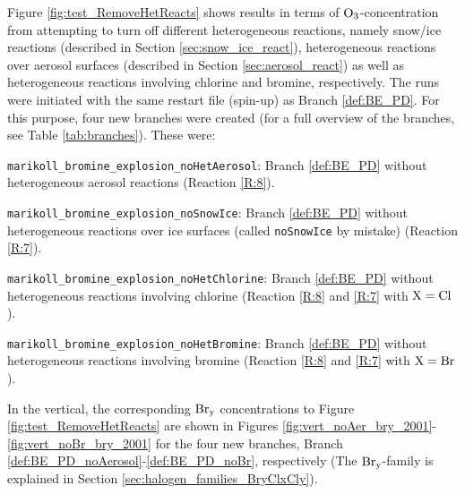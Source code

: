 Figure \ref{fig:test_RemoveHetReacts} shows results in terms of $\mathrm{O_3}$-concentration from attempting to turn off different heterogeneous reactions, namely snow/ice reactions (described in Section \ref{sec:snow_ice_react}), heterogeneous reactions over aerosol surfaces (described in Section \ref{sec:aerosol_react}) as well as heterogeneous reactions involving chlorine and bromine, respectively. The runs were initiated with the same restart file (spin-up) as Branch \ref{def:BE_PD}. For this purpose, four new branches were created (for a full overview of the branches, see Table \ref{tab:branches}). These were:

\begin{mydef}\label{def:BE_PD_noAerosol}
    \texttt{marikoll\_bromine\_explosion\_noHetAerosol}: Branch \ref{def:BE_PD} without heterogeneous aerosol reactions (Reaction \ref{R:8}). 
\end{mydef}

\begin{mydef}\label{def:BE_PD_noIce}
    \texttt{marikoll\_bromine\_explosion\_noSnowIce}: Branch \ref{def:BE_PD} without heterogeneous reactions over ice surfaces (called \texttt{noSnowIce} by mistake) (Reaction \ref{R:7}).
\end{mydef}

\begin{mydef}\label{def:BE_PD_noCl}
    \texttt{marikoll\_bromine\_explosion\_noHetChlorine}: Branch \ref{def:BE_PD} without heterogeneous reactions involving chlorine (Reaction \ref{R:8} and \ref{R:7} with $\mathrm{X} = \mathrm{Cl}$).
\end{mydef}

\begin{mydef}\label{def:BE_PD_noBr}
    \texttt{marikoll\_bromine\_explosion\_noHetBromine}: Branch \ref{def:BE_PD} without heterogeneous reactions involving bromine (Reaction \ref{R:8} and \ref{R:7} with $\mathrm{X} = \mathrm{Br}$).
\end{mydef}








\medskip

In the vertical, the corresponding $\mathrm{Br_y}$ concentrations to Figure \ref{fig:test_RemoveHetReacts} are shown in Figures \ref{fig:vert_noAer_bry_2001}-\ref{fig:vert_noBr_bry_2001} for the four new branches, Branch \ref{def:BE_PD_noAerosol}-\ref{def:BE_PD_noBr}, respectively (The $\mathrm{Br_y}$-family is explained in Section \ref{sec:halogen_families_BryClxCly}). 

